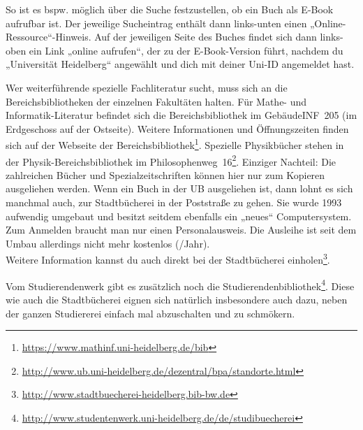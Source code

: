 So ist es bspw. möglich über die Suche festzustellen, ob ein Buch als E-Book aufrufbar ist. Der jeweilige Sucheintrag enthält dann links-unten einen „Online-Ressource“-Hinweis. Auf der jeweiligen Seite des Buches findet sich dann links-oben ein Link „online aufrufen“, der zu der E-Book-Version führt, nachdem du „Universität Heidelberg“ angewählt und dich mit deiner Uni-ID angemeldet hast.  

Wer weiterführende spezielle Fachliteratur sucht, muss sich an die Bereichsbibliotheken der einzelnen Fakultäten halten. Für Mathe- und Informatik-Literatur befindet sich die Bereichsbibliothek im Gebäude\-\gls{INF}~205 (im Erdgeschoss auf der Ostseite). Weitere Informationen und Öffnungszeiten finden sich auf der Webseite der Bereichsbibliothek\footnote{\url{https://www.mathinf.uni-heidelberg.de/bib}}. Spezielle Physikbücher stehen in der Physik-Bereichsbibliothek im Philosophenweg~16\footnote{\url{http://www.ub.uni-heidelberg.de/dezentral/bpa/standorte.html}}. Einziger Nachteil: Die zahlreichen Bücher und Spezialzeitschriften können hier nur zum Kopieren ausgeliehen werden. Wenn ein Buch in der UB ausgeliehen ist, dann lohnt es sich manchmal auch, zur Stadtbücherei in der Poststraße zu gehen. Sie wurde 1993 aufwendig umgebaut und besitzt seitdem ebenfalls ein „neues“ Computersystem. Zum Anmelden braucht man nur einen Personalausweis. Die Ausleihe ist seit dem Umbau allerdings nicht mehr kostenlos (/Jahr).\\ Weitere Information kannst du auch direkt bei der Stadtbücherei einholen\footnote{\url{http://www.stadtbuecherei-heidelberg.bib-bw.de}}.

Vom Studierendenwerk gibt es zusätzlich noch die Studierendenbibliothek\footnote{\url{http://www.studentenwerk.uni-heidelberg.de/de/studibuecherei}}. Diese wie auch die Stadtbücherei eignen sich natürlich insbesondere auch dazu, neben der ganzen Studiererei einfach mal abzuschalten und zu schmökern.
